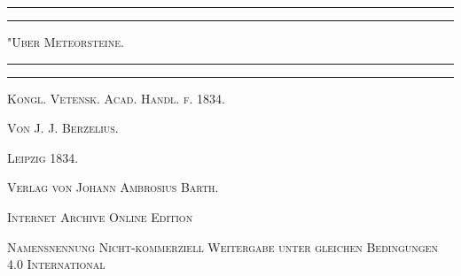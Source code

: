 \documentclass[a4paper, 11pt, oneside]{article}
\begin{document}
\begin{titlepage} %
	\centering %

	
	\rule{\textwidth}{1.6pt}\vspace*{-\baselineskip}\vspace*{2pt} %
	\rule{\textwidth}{0.4pt} %
	
	\vspace{1\baselineskip} %
	
	{\scshape\Huge "Uber Meteorsteine.\\[1.25pt]}
	
	\vspace{1\baselineskip} %

	\rule{\textwidth}{0.4pt}\vspace*{-\baselineskip}\vspace{3.2pt} %
	\rule{\textwidth}{1.6pt} %
	
	\vspace{1\baselineskip} %
	
	
	{\Large\scshape Kongl. Vetensk. Acad. Handl. f. 1834.} %
	
	\vspace*{1\baselineskip} %
	
    {\scshape\Large Von J. J. Berzelius.} %
    
    \vspace*{\fill}

	\vspace{1\baselineskip}

	{\Large\scshape Leipzig 1834.}
	
	{\Large\scshape{Verlag von Johann Ambrosius Barth.}}
	
	\vspace{0.5\baselineskip} %

    \scshape\Large Internet Archive Online Edition  %
	
	{\scshape\Large Namensnennung Nicht-kommerziell Weitergabe unter gleichen Bedingungen 4.0 International} %
\end{titlepage}
\setlength{\parskip}{1mm plus1mm minus1mm}
\clearpage
\pagestyle{fancy}
\fancyhf{}
\cfoot{\swabfamily{\thepage}}
\tableofcontents
\clearpage
\LARGE
\end{document}
